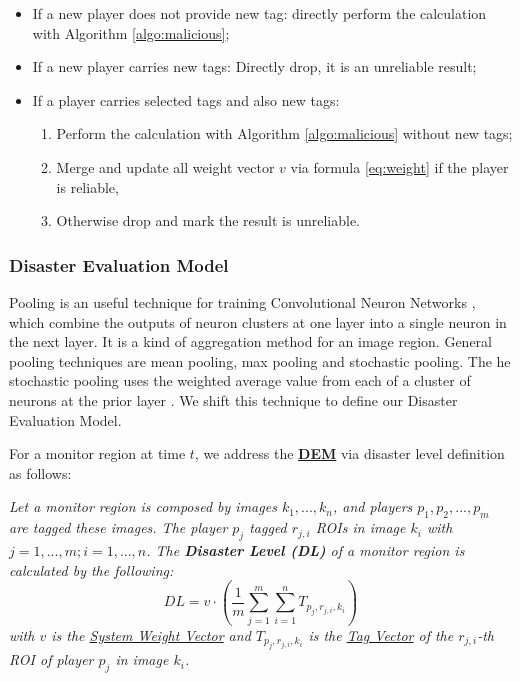 \begin{itemize}
\item If a new player does not provide new tag: directly perform the calculation with Algorithm \ref{algo:malicious};
\item If a new player carries new tags: Directly drop, it is an unreliable result;
\item If a player carries selected tags and also new tags: 
  \begin{enumerate}
    \item Perform the calculation with Algorithm \ref{algo:malicious} without new tags;
    \item Merge and update all weight vector $v$ via formula \ref{eq:weight} if the player is reliable, 
    \item Otherwise drop and mark the result is unreliable.
  \end{enumerate}
\end{itemize}

\subsubsection{Disaster Evaluation Model}
\label{chapter:dem}

Pooling is an useful technique for training Convolutional Neuron Networks \cite{ciresan2011flexible, krizhevsky2012imagenet},
which combine the outputs of neuron clusters at one layer into a single neuron in the next layer.
It is a kind of aggregation method for an image region.
General pooling techniques are mean pooling, max pooling and stochastic pooling.
The he stochastic pooling uses the weighted average value from 
each of a cluster of neurons at the prior layer \cite{ciregan2012multi}.
We shift this technique to define our Disaster Evaluation Model.

For a monitor region at time $t$, we address the \textbf{\hyperref[idx:dem]{DEM}} 
via disaster level definition as follows:

\begin{definition}
\label{def:dl}
\emph{
Let a monitor region is composed by images $k_1, ..., k_n$, and players $p_1, p_2, ..., p_m$
are tagged these images. The player $p_j$ tagged $r_{j,i}$ ROIs in image $k_i$ with $j=1, ..., m; i=1, ..., n$.
The \textbf{Disaster Level (DL)} of a monitor region is calculated by the following:
\begin{equation}
\label{eq:dl}
DL = v \cdot 
  \left(
    \frac{1}{m}
    \sum_{j=1}^{m}{
      \sum_{i=1}^{n}{
          T_{ p_{j}, r_{j,i}, k_{i} }
      }
    }
  \right)
\end{equation}
with $v$ is the \hyperref[def:weightv]{System Weight Vector} and 
$ T_{ p_{j}, r_{j,i}, k_{i} } $ is the \hyperref[def:tagv]{Tag Vector} of the $r_{j,i}$-th ROI of player $p_j$ in image $k_i$.
}
\end{definition}

